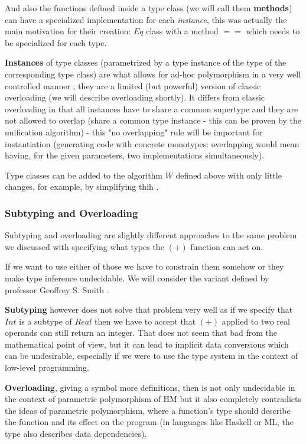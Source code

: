 And also the functions defined inside a type class (we will call them \textbf{methods}) can have a specialized implementation for each \emph{instance}, this was actually the main motivation for their creation: $Eq$ class with a method $==$ which needs to be specialized for each type. \cite{hall1994type}

\textbf{Instances} of type classes (parametrized by a type instance of the type of the corresponding type class) are what allows for ad-hoc polymorphism in a very well controlled manner \cite{wadler1989make}, they are a limited (but powerful) version of classic overloading (we will describe overloading shortly). It differs from classic overloading in that all instances have to share a common supertype and they are not allowed to overlap (share a common type instance - this can be proven by the unification algorithm) - this "no overlapping" rule will be important for instantiation (generating code with concrete monotypes: overlapping would mean having, for the given parameters, two implementations simultaneously).

Type classes can be added to the algorithm $W$ defined above with only little changes, for example, by simplifying thih \cite{jones1999typing}.

\subsubsection{Subtyping and Overloading}

Subtyping and overloading are slightly different approaches to the same problem we discussed with specifying what types the $(+)$ function can act on.

If we want to use either of those we have to constrain them somehow or they make type inference undecidable. We will consider the variant defined by professor Geoffrey S. Smith \cite{smith1993polymorphic}.

\textbf{Subtyping} however does not solve that problem very well as if we specify that $Int$ is a subtype of $Real$ then we have to accept that $(+)$ applied to two real operands can still return an integer. That does not seem that bad from the mathematical point of view, but it can lead to implicit data conversions which can be undesirable, especially if we were to use the type system in the context of low-level programming.

\textbf{Overloading}, giving a symbol more definitions, then is not only undecidable in the context of parametric polymorphism of HM but it also completely contradicts the ideas of parametric polymorphism, where a function's type should describe the function and its effect on the program (in languages like Haskell or ML, the type also describes data dependencies). \cite{palsberg2012overloading}

